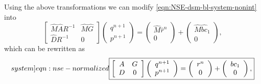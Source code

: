 \documentclass{article}
\numberwithin{equation}{section}
\begin{document}
Using the above transformations we can modify \cref{eqn:NSE-dsm-bl-system-nonint}
into 
\begin{equation*}
\left[\begin{array}{cc}
\hat{M}\hat{A}R^{-1} & \hat{M}\hat{G} \\
\hat{D}R^{-1} & 0
\end{array}\right]\left(\begin{array}{c}
q^{n+1} \\
p^{n+1}
\end{array}\right)=\left(\begin{array}{c}
\hat{M}\hat{r}^n \\
0
\end{array}\right)+\left(\begin{array}{c}
\hat{M}\widehat{b c}_1 \\
0
\end{array}\right),
\end{equation*}
which can be rewritten as 
\begin{equation}\label[system]{eqn:nse-normalized}
\boxed{\left[\begin{array}{cc}
A & G \\
D & 0
\end{array}\right]\left(\begin{array}{c}
q^{n+1} \\
p^{n+1}
\end{array}\right)=\left(\begin{array}{c}
r^n \\
0
\end{array}\right)+\left(\begin{array}{c}
{b c}_1 \\
0
\end{array}\right),}
\end{equation}
\end{document}
